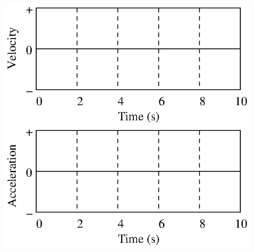 \begin{enumerate}
\vspace{0.3cm}
{\par\centering \includegraphics{iqsRelatingMotion/changing_fig12.eps} \par}
\vspace{0.3cm}





\end{enumerate}
